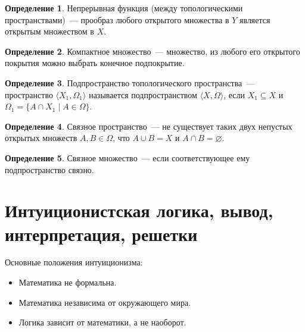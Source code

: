 \documentclass[a4paper,11pt]{article}
\theoremstyle{definition}
\newtheorem*{dfn}{Определение}
\begin{document}
\begin{dfn}
Непрерывная функция (между топологическими пространствами)~--- прообраз любого
открытого множества в $Y$ является открытым множеством в $X$.
\end{dfn}
\begin{dfn}
Компактное множество~--- множество, из любого его открытого покрытия можно
выбрать конечное подпокрытие.
\end{dfn}
\begin{dfn}
Подпространство топологического пространства~--- пространство $\langle X_1,
\Omega_1\rangle$ называется подпространством $\langle X, \Omega\rangle$, если
$X_1 \subseteq X$ и $\Omega_1 = \{A \cap X_1 \mid A \in \Omega\}$.
\end{dfn}
\begin{dfn}
Связное пространство~--- не существует таких двух непустых открытых множеств
$A, B \in \Omega$, что $A \cup B = X$ и $A \cap B = \varnothing$.
\end{dfn}
\begin{dfn}
Связное множество~--- если соответствующее ему подпространство связно.
\end{dfn}

\section{Интуиционистская логика, вывод, интерпретация, решетки}
Основные положения интуиционизма:
\begin{itemize}
\item Математика не формальна.
\item Математика независима от окружающего мира.
\item Логика зависит от математики, а не наоборот.
\end{itemize}
\end{document}

